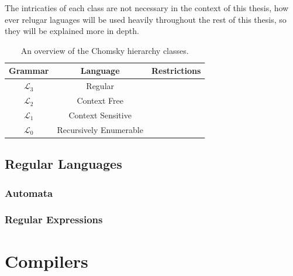 The intricaties of each class are not necessary in the context of this thesis, how ever relugar laguages will be used heavily throughout the rest of this thesis, so they will be explained more in depth.

\begin{table}[h]
\centering
\begin{tabular}{@{}ccl@{}}
\toprule
Grammar         & Language               & Restrictions \\ \midrule
$\mathcal{L}_3$ & Regular                &              \\
$\mathcal{L}_2$ & Context Free           &              \\
$\mathcal{L}_1$ & Context Sensitive      &              \\
$\mathcal{L}_0$ & Recursively Enumerable &              \\ \bottomrule
\end{tabular}
\caption{An overview of the Chomsky hierarchy classes.}
\label{tab:chomsky-hierarchy}
\end{table}

\subsection{Regular Languages}
\subsubsection{Automata}
\subsubsection{Regular Expressions} 







\begin{definition}
\label{def:FSM}
\end{definition}


\begin{definition}
\label{def:regular_exp}
\end{definition}


  


\section{Compilers}


